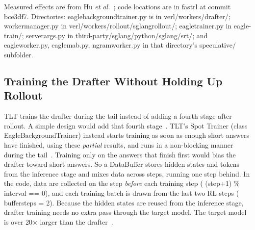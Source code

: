 \documentclass[conference]{IEEEtran}
\newcommand{\brkus}{\textunderscore\allowbreak}
\newcommand{\code}[1]{{\small\ttfamily\let\_\brkus\hyphenchar\font=-1 #1}}
\newcommand{\x}{\ensuremath{\times}}
\newcommand{\tcode}[1]{{\ttfamily\let\_\brkus\hyphenchar\font=-1 #1}}
\begin{document}
\begin{table}[t]
\raggedright\footnotesize Measured effects are from Hu \emph{et al.}~\cite{hu2026tlt}; code locations are in \code{fastrl} at commit \code{bce3df7}. Directories: \tcode{eagle\_background\_trainer.py} is in \tcode{verl/workers/drafter/}; \tcode{worker\_manager.py} in \tcode{verl/workers/rollout/sglang\_rollout/}; \tcode{eagle\_trainer.py} in \tcode{eagle-train/}; \tcode{server\_args.py} in \tcode{third-party/sglang/python/sglang/srt/}; and \tcode{eagle\_worker.py}, \tcode{eagle\_mab.py}, \tcode{ngram\_worker.py} in that directory's \tcode{speculative/} subfolder.
\end{table}

\subsection{Training the Drafter Without Holding Up Rollout}
TLT trains the drafter during the tail instead of adding a fourth stage after rollout. A simple design would add that fourth stage~\cite[Fig.~8]{hu2026tlt}. TLT's Spot Trainer (class \code{EagleBackgroundTrainer}) instead starts training as soon as enough short answers have finished, using these \emph{partial} results, and runs in a non-blocking manner during the tail~\cite[Sec.~4.2]{hu2026tlt}. Training only on the answers that finish first would bias the drafter toward short answers. So a DataBuffer stores hidden states and tokens from the inference stage and mixes data across steps, running one step behind. In the code, data are collected on the step \emph{before} each training step (\code{(step+1) \% interval == 0}), and each training batch is drawn from the last two RL steps (\code{buffer\_steps = 2}). Because the hidden states are reused from the inference stage, drafter training needs no extra pass through the target model. The target model is over 20\x{} larger than the drafter~\cite[Sec.~4.1]{hu2026tlt}.
\end{document}
